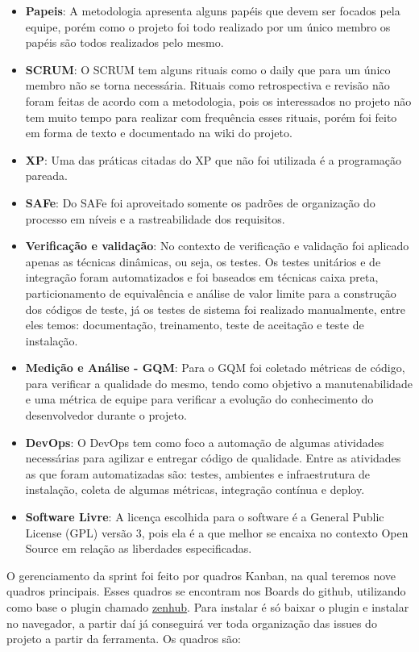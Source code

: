 \begin{itemize}
  \item \textbf{Papeis}: A metodologia apresenta alguns papéis que devem ser focados pela equipe, porém como o projeto foi todo realizado por um único membro os papéis são todos realizados pelo mesmo.
  \item \textbf{SCRUM}: O SCRUM tem alguns rituais como o daily que para um único membro não se torna necessária.  Rituais como retrospectiva e revisão não foram feitas de acordo com a metodologia, pois os interessados no projeto não tem muito tempo para realizar com frequência esses rituais, porém foi feito em forma de texto e documentado na wiki do projeto.
  \item \textbf{XP}: Uma das práticas citadas do XP que não foi utilizada é a programação pareada.
  \item \textbf{SAFe}: Do SAFe foi aproveitado somente os padrões de organização do processo em níveis e a rastreabilidade dos requisitos.
  \item \textbf{Verificação e validação}: No contexto de verificação e validação foi aplicado apenas as técnicas dinâmicas, ou seja, os testes. Os testes unitários e de integração foram automatizados e foi baseados em técnicas caixa preta, particionamento de equivalência e análise de valor limite para a construção dos códigos de teste, já os testes de sistema foi realizado manualmente, entre eles temos: documentação, treinamento, teste de aceitação e teste de instalação.
  \item \textbf{Medição e Análise - GQM}: Para o GQM foi coletado métricas de código, para verificar a qualidade do mesmo, tendo como objetivo a manutenabilidade e uma métrica de equipe para verificar a evolução do conhecimento do desenvolvedor durante o projeto.
  \item \textbf{DevOps}: O DevOps tem como foco a automação de algumas atividades necessárias para agilizar e entregar código de qualidade. Entre as atividades as que foram automatizadas são: testes, ambientes e infraestrutura de instalação, coleta de algumas métricas, integração contínua e deploy.
  \item \textbf{Software Livre}: A licença escolhida para o software é a General Public License (GPL) versão 3, pois ela é a que melhor se encaixa no contexto Open Source em relação as liberdades especificadas.
\end{itemize}

O gerenciamento da sprint foi feito por quadros Kanban, na qual teremos nove quadros principais. Esses quadros se encontram nos Boards do github, utilizando como base o plugin chamado \href{https://www.zenhub.com/}{zenhub}. Para instalar é só baixar o plugin e instalar no navegador, a partir daí já conseguirá ver toda organização das issues do projeto a partir da ferramenta. Os quadros são:

